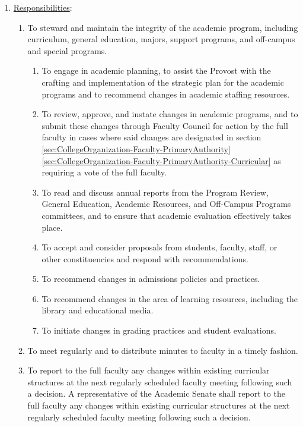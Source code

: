 \begin{enumerate}[label=\alph*)]
{\begin{enumerate}[label=\arabic*)]
							\end{enumerate}
						}
						\item{\underline{Responsibilities}:
							\begin{enumerate}[label=\arabic*)]
								\item{To steward and maintain the integrity of the academic program, including curriculum, general education, majors, support programs, and off-campus and special programs.
									\begin{enumerate}[label=(\alph*)]
										\item{To engage in academic planning, to assist the Provost with the crafting and implementation of the strategic plan for the academic programs and to recommend changes in academic staffing resources.}
										\item{To review, approve, and instate changes in academic programs, and to submit these changes through Faculty Council for action by the full faculty in cases where said changes are designated in
											section
											\ref{sec:CollegeOrganization-Faculty-PrimaryAuthority}
											\ref{sec:CollegeOrganization-Faculty-PrimaryAuthority-Curricular}
											as requiring a vote of the full faculty.}
										\item{To read and discuss annual reports from the Program Review, General Education, Academic Resources, and Off-Campus Programs committees, and to ensure that academic evaluation effectively takes place.}
										\item{To accept and consider proposals from students, faculty, staff, or other constituencies and respond with recommendations.}
										\item{To recommend changes in admissions policies and practices.}
										\item{To recommend changes in the area of learning resources, including the library and educational media.}
										\item{To initiate changes in grading practices and student evaluations.}
									\end{enumerate}
								}
								\item{To meet regularly and to distribute minutes to faculty in a timely fashion.}
								\item{To report to the full faculty any changes within existing curricular structures at the next regularly scheduled faculty meeting following such a decision. A representative of the Academic Senate shall report to the full faculty any changes within existing curricular structures at the next regularly scheduled faculty meeting following such a decision.}

\end{enumerate}}
\end{enumerate}
